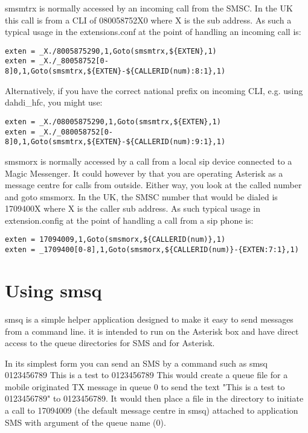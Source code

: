    smsmtrx is normally accessed by an incoming call from the SMSC. In the
   UK this call is from a CLI of 080058752X0 where X is the sub address.
   As such a typical usage in the extensions.conf at the point of
   handling an incoming call is:
\begin{astlisting}
\begin{verbatim}
exten = _X./8005875290,1,Goto(smsmtrx,${EXTEN},1)
exten = _X./_80058752[0-8]0,1,Goto(smsmtrx,${EXTEN}-${CALLERID(num):8:1},1)
\end{verbatim}
\end{astlisting}

   Alternatively, if you have the correct national prefix on incoming
   CLI, e.g. using dahdi\_hfc, you might use:
\begin{astlisting}
\begin{verbatim}
exten = _X./08005875290,1,Goto(smsmtrx,${EXTEN},1)
exten = _X./_080058752[0-8]0,1,Goto(smsmtrx,${EXTEN}-${CALLERID(num):9:1},1)
\end{verbatim}
\end{astlisting}

   smsmorx is normally accessed by a call from a local sip device
   connected to a Magic Messenger. It could however by that you are
   operating Asterisk as a message centre for calls from outside. Either
   way, you look at the called number and goto smsmorx. In the UK, the
   SMSC number that would be dialed is 1709400X where X is the caller sub
   address. As such typical usage in extension.config at the point of
   handling a call from a sip phone is:
\begin{astlisting}
\begin{verbatim}
exten = 17094009,1,Goto(smsmorx,${CALLERID(num)},1)
exten = _1709400[0-8],1,Goto(smsmorx,${CALLERID(num)}-{EXTEN:7:1},1)
\end{verbatim}
\end{astlisting}

\section{Using smsq}

   smsq is a simple helper application designed to make it easy to send
   messages from a command line. it is intended to run on the Asterisk
   box and have direct access to the queue directories for SMS and for
   Asterisk.

   In its simplest form you can send an SMS by a command such as
   smsq 0123456789 This is a test to 0123456789
   This would create a queue file for a mobile originated TX message in
   queue 0 to send the text "This is a test to 0123456789" to 0123456789.
   It would then place a file in the 
   directory to initiate a call to 17094009 (the default message centre
   in smsq) attached to application SMS with argument of the queue name
   (0).

